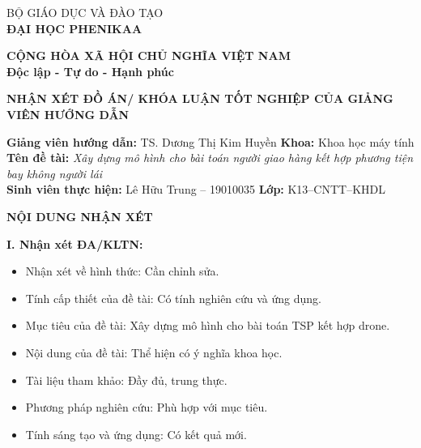 \noindent
\begin{minipage}[t]{0.48\textwidth}
    \begin{center}
        BỘ GIÁO DỤC VÀ ĐÀO TẠO\\
        \textbf{ĐẠI HỌC PHENIKAA}
    \end{center}
\end{minipage}
\hfill
\begin{minipage}[t]{0.48\textwidth}
    \begin{center}
        {\fontsize{8pt}{11pt}\selectfont \textbf{CỘNG HÒA XÃ HỘI CHỦ NGHĨA VIỆT NAM}}\\
        \textbf{Độc lập - Tự do - Hạnh phúc}
    \end{center}
\end{minipage}

\vspace{0.5cm}
\begin{center}
    \textbf{\Large NHẬN XÉT ĐỒ ÁN/ KHÓA LUẬN TỐT NGHIỆP CỦA GIẢNG VIÊN HƯỚNG DẪN}
\end{center}

\vspace{0.5cm}

\noindent\textbf{Giảng viên hướng dẫn:} TS. Dương Thị Kim Huyền \hfill \textbf{Khoa:} Khoa học máy tính\\
\textbf{Tên đề tài:} \textit{Xây dựng mô hình cho bài toán người giao hàng kết hợp phương tiện bay không người lái}\\
\textbf{Sinh viên thực hiện:} Lê Hữu Trung -- 19010035 \hfill \textbf{Lớp:} K13--CNTT--KHDL

\vspace{0.8cm}
\begin{center}
    \textbf{NỘI DUNG NHẬN XÉT}
\end{center}

\noindent\textbf{I. Nhận xét ĐA/KLTN:}
\begin{itemize}
    \item[-] Nhận xét về hình thức: Cần chỉnh sửa.
    \item[-] Tính cấp thiết của đề tài: Có tính nghiên cứu và ứng dụng.
    \item[-] Mục tiêu của đề tài: Xây dựng mô hình cho bài toán TSP kết hợp drone.
    \item[-] Nội dung của đề tài: Thể hiện có ý nghĩa khoa học.
    \item[-] Tài liệu tham khảo: Đầy đủ, trung thực.
    \item[-] Phương pháp nghiên cứu: Phù hợp với mục tiêu.
    \item[-] Tính sáng tạo và ứng dụng: Có kết quả mới.
\end{itemize}

